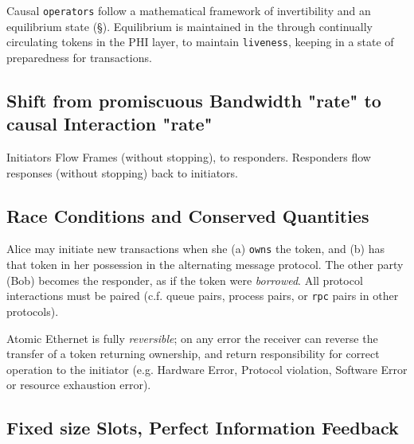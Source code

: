 \documentclass[../HFT-main.tex]{subfiles}
\begin{document}
Causal \texttt{operators} follow a mathematical framework of invertibility and an equilibrium state (\S). Equilibrium is maintained in the \LINK through continually circulating  tokens in the PHI layer, to maintain \texttt{liveness}, keeping  \LINKs in a state of preparedness for  transactions.    

\subsection{Shift from promiscuous Bandwidth "rate" to causal Interaction "rate"}

Initiators Flow Frames (without stopping), to responders. Responders flow responses (without stopping) back to initiators. 

\subsection{Race Conditions and Conserved Quantities}


Alice may initiate new transactions when she (a) \texttt{owns} the token, and (b) has that token in her possession in the alternating message protocol. The other party (Bob) becomes the responder, as if the token were \emph{borrowed}.  All protocol interactions must be paired (c.f. queue pairs, process pairs, or \texttt{rpc} pairs in other protocols).


Atomic Ethernet is fully \emph{reversible}; on any error the receiver can reverse the transfer of a token returning ownership, and return responsibility  for correct operation to the initiator  (e.g. Hardware Error, Protocol violation, Software Error or resource exhaustion error). 

\subsection{Fixed size Slots, Perfect Information Feedback}
\end{document}
